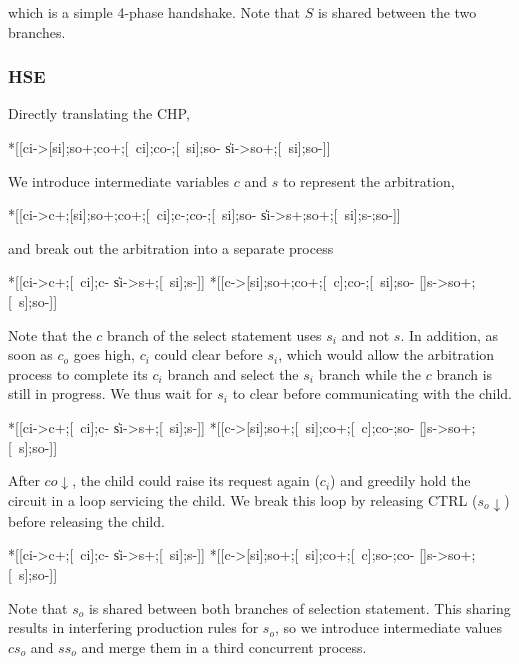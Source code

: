 \documentclass{article}
\begin{document}
\noindent which is a simple 4-phase handshake. Note that $S$ is shared between the two branches.

\subsubsection*{HSE}

\noindent Directly translating the CHP,

\begin{hse}
*[[ci->[si];so+;co+;[~ci];co-;[~si];so-
  \|si->so+;[~si];so-]]
\end{hse}

\noindent We introduce intermediate variables $c$ and $s$ to represent the arbitration,

\begin{hse}
*[[ci->c+;[si];so+;co+;[~ci];c-;co-;[~si];so-
  \|si->s+;so+;[~si];s-;so-]]
\end{hse}

\noindent and break out the arbitration into a separate process

\begin{hse}
*[[ci->c+;[~ci];c-
  \|si->s+;[~si];s-]]
*[[c->[si];so+;co+;[~c];co-;[~si];so-
  []s->so+;[~s];so-]]
\end{hse}

\noindent Note that the $c$ branch of the select statement uses $s_i$ and not $s$. In addition, as soon as $c_o$ goes high, $c_i$ could clear before $s_i$, which would allow the arbitration process to complete its $c_i$ branch and select the $s_i$ branch while the $c$ branch is still in progress. We thus wait for $s_i$ to clear before communicating with the child.

\begin{hse}
*[[ci->c+;[~ci];c-
  \|si->s+;[~si];s-]]
*[[c->[si];so+;[~si];co+;[~c];co-;so-
  []s->so+;[~s];so-]]
\end{hse}

\noindent After $co\!\downarrow$, the child could raise its request again ($c_i$) and greedily hold the circuit in a loop servicing the child. We break this loop by releasing CTRL ($s_o\!\downarrow$) before releasing the child.

\begin{hse}
*[[ci->c+;[~ci];c-
  \|si->s+;[~si];s-]]
*[[c->[si];so+;[~si];co+;[~c];so-;co-
  []s->so+;[~s];so-]]
\end{hse}

\noindent Note that $s_o$ is shared between both branches of selection statement. This sharing results in interfering production rules for $s_o$, so we introduce intermediate values $cs_o$ and $ss_o$ and merge them in a third concurrent process.
\end{document}
